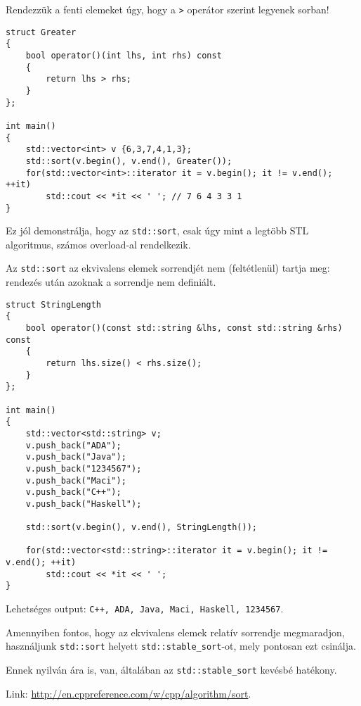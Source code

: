 \documentclass[a4paper,11.5pt,table]{article}
\begin{document}
	\medskip
	Rendezzük a fenti elemeket úgy, hogy a \texttt{>} operátor szerint legyenek sorban!
	\begin{lstlisting}
struct Greater
{
	bool operator()(int lhs, int rhs) const
	{
		return lhs > rhs;
	}
};

int main()
{
	std::vector<int> v {6,3,7,4,1,3};
	std::sort(v.begin(), v.end(), Greater());
	for(std::vector<int>::iterator it = v.begin(); it != v.end(); ++it)
		std::cout << *it << ' '; // 7 6 4 3 3 1 
}
	\end{lstlisting}
	\begin{note}
		Ez jól demonstrálja, hogy az \texttt{std::sort}, csak úgy mint a legtöbb STL algoritmus, számos overload-al rendelkezik.
	\end{note}
	Az \texttt{std::sort} az ekvivalens elemek sorrendjét nem (feltétlenül) tartja meg: rendezés után azoknak a sorrendje nem definiált.
	\begin{lstlisting}
struct StringLength
{
	bool operator()(const std::string &lhs, const std::string &rhs) const
	{
		return lhs.size() < rhs.size();
	}
};

int main()
{
	std::vector<std::string> v;
	v.push_back("ADA");
	v.push_back("Java");
	v.push_back("1234567");
	v.push_back("Maci");
	v.push_back("C++");
	v.push_back("Haskell");
	
	std::sort(v.begin(), v.end(), StringLength());
	
	for(std::vector<std::string>::iterator it = v.begin(); it != v.end(); ++it)
		std::cout << *it << ' ';
}
	\end{lstlisting}
	Lehetséges output: \texttt{C++, ADA, Java, Maci, Haskell, 1234567}.
	
	Amennyiben fontos, hogy az ekvivalens elemek relatív sorrendje megmaradjon, használjunk \texttt{std::sort} helyett \texttt{std::stable\_sort}-ot, mely pontosan ezt csinálja.
	\begin{note}
		Ennek nyilván ára is, van, általában az \texttt{std::stable\_sort} kevésbé hatékony.
	\end{note}
	
	Link: \url{http://en.cppreference.com/w/cpp/algorithm/sort}.
\end{document}
